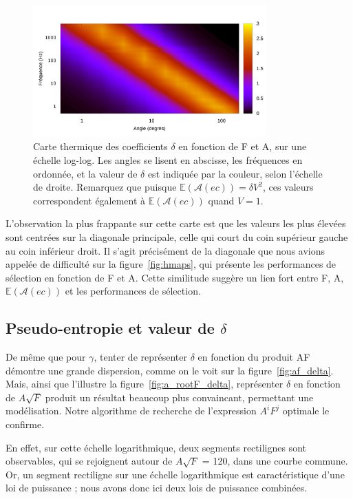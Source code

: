 	\begin{figure}[htbp]
		\centering
		\includegraphics[width=0.8\textwidth]{figures/ch4/afRealDelta_log}
		\caption[Coefficients $\delta$ en fonction de F et A]{Carte thermique des coefficients $\delta$ en fonction de F et A, sur une échelle log-log. Les angles se lisent en abscisse, les fréquences en ordonnée, et la valeur de $\delta$ est indiquée par la couleur, selon l'échelle de droite. Remarquez que puisque $\mathbb{E}(\mathcal{A}(ec)) = \delta{}V^{2}$, ces valeurs correspondent également à $\mathbb{E}(\mathcal{A}(ec))$ quand $V = 1$.}
		\label{fig:afRealDelta_log}
	\end{figure}
	
	L'observation la plus frappante sur cette carte est que les valeurs les plus élevées sont centrées sur la diagonale principale, celle qui court du coin supérieur gauche au coin inférieur droit. Il s'agit précisément de la diagonale que nous avions appelée \og de difficulté \fg{} sur la figure~\ref{fig:hmaps}, qui présente les performances de sélection en fonction de F et A. Cette similitude suggère un lien fort entre F, A, $\mathbb{E}(\mathcal{A}(ec))$ et les performances de sélection.
	
	\subsection{Pseudo-entropie et valeur de \texorpdfstring{$\delta$}{delta}}
	
	De même que pour $\gamma$, tenter de représenter $\delta$ en fonction du produit AF démontre une grande dispersion, comme on le voit sur la figure~\ref{fig:af_delta}. Mais, ainsi que l'illustre la figure~\ref{fig:a_rootF_delta}, représenter $\delta$ en fonction de $A\sqrt{F}$ produit un résultat beaucoup plus convaincant, permettant une modélisation. Notre algorithme de recherche de l'expression $A^{i}F^{j}$ optimale le confirme.
	
	En effet, sur cette échelle logarithmique, deux segments rectilignes sont observables, qui se rejoignent autour de $A\sqrt{F}$ = 120, dans une courbe commune. Or, un segment rectiligne sur une échelle logarithmique est caractéristique d'une loi de puissance ; nous avons donc ici deux lois de puissance combinées.
	
